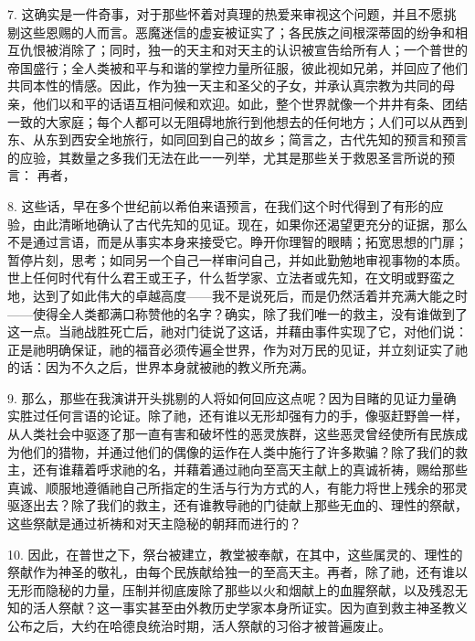 7. 这确实是一件奇事，对于那些怀着对真理的热爱来审视这个问题，并且不愿挑剔这些恩赐的人而言。恶魔迷信的虚妄被证实了；各民族之间根深蒂固的纷争和相互仇恨被消除了；同时，独一的天主和对天主的认识被宣告给所有人；一个普世的帝国盛行；全人类被和平与和谐的掌控力量所征服，彼此视如兄弟，并回应了他们共同本性的情感。因此，作为独一天主和圣父的子女，并承认真宗教为共同的母亲，他们以和平的话语互相问候和欢迎。如此，整个世界就像一个井井有条、团结一致的大家庭；每个人都可以无阻碍地旅行到他想去的任何地方；人们可以从西到东、从东到西安全地旅行，如同回到自己的故乡；简言之，古代先知的预言和预言的应验，其数量之多我们无法在此一一列举，尤其是那些关于救恩圣言所说的预言： 再者， \par

8. 这些话，早在多个世纪前以希伯来语预言，在我们这个时代得到了有形的应验，由此清晰地确认了古代先知的见证。现在，如果你还渴望更充分的证据，那么不是通过言语，而是从事实本身来接受它。睁开你理智的眼睛；拓宽思想的门扉；暂停片刻，思考；如同另一个自己一样审问自己，并如此勤勉地审视事物的本质。世上任何时代有什么君王或王子，什么哲学家、立法者或先知，在文明或野蛮之地，达到了如此伟大的卓越高度——我不是说死后，而是仍然活着并充满大能之时——使得全人类都满口称赞他的名字？确实，除了我们唯一的救主，没有谁做到了这一点。当祂战胜死亡后，祂对门徒说了这话，并藉由事件实现了它，对他们说： 正是祂明确保证，祂的福音必须传遍全世界，作为对万民的见证，并立刻证实了祂的话：因为不久之后，世界本身就被祂的教义所充满。\par

9. 那么，那些在我演讲开头挑剔的人将如何回应这点呢？因为目睹的见证力量确实胜过任何言语的论证。除了祂，还有谁以无形却强有力的手，像驱赶野兽一样，从人类社会中驱逐了那一直有害和破坏性的恶灵族群，这些恶灵曾经使所有民族成为他们的猎物，并通过他们的偶像的运作在人类中施行了许多欺骗？除了我们的救主，还有谁藉着呼求祂的名，并藉着通过祂向至高天主献上的真诚祈祷，赐给那些真诚、顺服地遵循祂自己所指定的生活与行为方式的人，有能力将世上残余的邪灵驱逐出去？除了我们的救主，还有谁教导祂的门徒献上那些无血的、理性的祭献，这些祭献是通过祈祷和对天主隐秘的朝拜而进行的？\par

10. 因此，在普世之下，祭台被建立，教堂被奉献，在其中，这些属灵的、理性的祭献作为神圣的敬礼，由每个民族献给独一的至高天主。再者，除了祂，还有谁以无形而隐秘的力量，压制并彻底废除了那些以火和烟献上的血腥祭献，以及残忍无知的活人祭献？这一事实甚至由外教历史学家本身所证实。因为直到救主神圣教义公布之后，大约在哈德良统治时期，活人祭献的习俗才被普遍废止。\par

